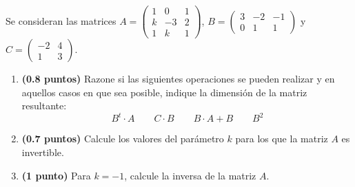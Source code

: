 
Se consideran las matrices
$A=\begin{pmatrix}1&0&1\\k&-3&2\\1&k&1\end{pmatrix}$,
$B=\begin{pmatrix}3&-2&-1\\0&1&1\end{pmatrix}$ y
$C=\begin{pmatrix}-2&4\\1&3\end{pmatrix}$.
\begin{enumerate}[label=\alph*)]
  \item \textbf{(0.8 puntos)} Razone si las siguientes operaciones se pueden
  realizar y en aquellos casos en que sea posible, indique la dimensión
  de la matriz resultante:
  \[
  B^t\cdot A\qquad C\cdot B\qquad B\cdot A+B\qquad B^2
  \]
  \item \textbf{(0.7 puntos)} Calcule los valores del parámetro $k$ para
  los que la matriz $A$ es invertible.
  \item \textbf{(1 punto)} Para $k=-1$, calcule la inversa de la matriz $A$.
\end{enumerate}
